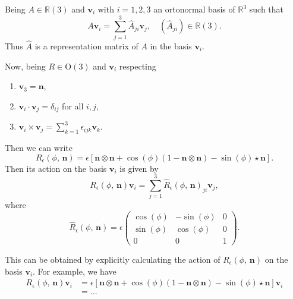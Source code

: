 \begin{example}[Exercise]
    Being \(A \in \mathbb{R}(3)\) and \(\mathbf{v}_i\) with \(i=1,2,3\) an ortonormal basis of \(\mathbb{R}^3\) such that
    \[
        A \mathbf{v}_i = \sum_{j=1}^3 \hat{A}_{ji} \mathbf{v}_j, \quad (\hat{A}_{ji}) \in \mathbb{R}(3).
    \]
    Thus \(\hat{A}\) is a representation matrix of \(A\) in the basis \(\mathbf{v}_i\).

    Now, being \(R \in \mathrm{O}(3)\) and \(\mathbf{v}_i\)  respecting
    \begin{enumerate}
        \item \(\mathbf{v}_3 = \mathbf{n}\),
        \item \(\mathbf{v}_i \cdot \mathbf{v}_j = \delta_{ij}\) for all \(i,j\),
        \item \(\mathbf{v}_i \times \mathbf{v}_j = \sum_{k=1}^3 \epsilon_{ijk} \mathbf{v}_k\).
    \end{enumerate}
    Then we can write
    \[
        R_{\epsilon}(\phi,\,\mathbf{n}) = \epsilon \left[ \mathbf{n} \otimes \mathbf{n} + \cos(\phi) (1 - \mathbf{n} \otimes \mathbf{n}) - \sin(\phi) \star \mathbf{n} \right].
    \]
    Then its action on the basis \(\mathbf{v}_i\) is given by
    \[
        R_{\epsilon}(\phi,\,\mathbf{n}) \mathbf{v}_i = \sum_{j=1}^3 \hat{R}_{\epsilon}(\phi,\,\mathbf{n})_{ji} \mathbf{v}_j,
    \]
    where
    \[
        \hat{R}_{\epsilon}(\phi,\,\mathbf{n}) = \epsilon \begin{pmatrix}
            \cos(\phi) & -\sin(\phi) & 0 \\
            \sin(\phi) & \cos(\phi)  & 0 \\
            0          & 0           & 1
        \end{pmatrix}.
    \]

    This can be obtained by explicitly calculating the action of \(R_{\epsilon}(\phi,\,\mathbf{n})\) on the basis \(\mathbf{v}_i\). For example, we have
    \[
        \begin{aligned}
            R_{\epsilon}(\phi,\,\mathbf{n}) \mathbf{v}_i & = \epsilon \left[ \mathbf{n} \otimes \mathbf{n} + \cos(\phi) (1 - \mathbf{n} \otimes \mathbf{n}) - \sin(\phi) \star \mathbf{n} \right] \mathbf{v}_i \\
                                                         & = \dots
        \end{aligned}
    \]


\end{example}
